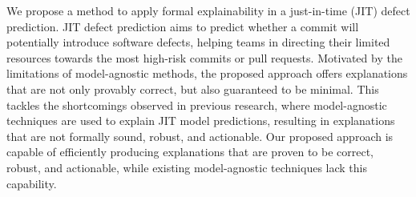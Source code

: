 We propose a method to apply formal explainability in a just-in-time (JIT) defect prediction.
%
JIT defect prediction aims to predict whether a commit will potentially introduce
software defects, helping teams in directing their limited resources towards the
most high-risk commits or pull requests.
%
%
Motivated by the limitations of model-agnostic methods, the proposed approach offers explanations that are not only provably correct,
but also guaranteed to be minimal.
%
This tackles the shortcomings observed in previous research, where model-agnostic techniques are
used to explain JIT model predictions, resulting in explanations
that are not formally sound, robust, and actionable.
%
Our proposed approach is capable of efficiently producing explanations that 
are proven to be correct, robust, and actionable, while existing model-agnostic techniques
lack this capability.
